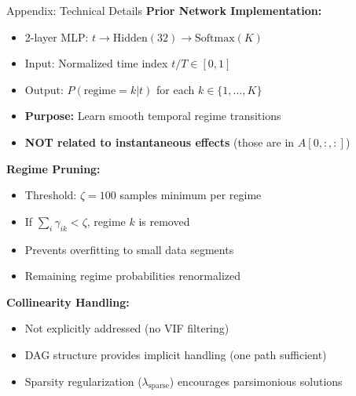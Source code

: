 \documentclass[aspectratio=169]{beamer}
\begin{document}
\begin{frame}{Appendix: Technical Details}
\textbf{Prior Network Implementation:}
\begin{itemize}
    \item 2-layer MLP: $t \to \text{Hidden}(32) \to \text{Softmax}(K)$
    \item Input: Normalized time index $t/T \in [0,1]$
    \item Output: $P(\text{regime}=k | t)$ for each $k \in \{1, \ldots, K\}$
    \item \textbf{Purpose:} Learn smooth temporal regime transitions
    \item \textbf{NOT related to instantaneous effects} (those are in $A[0,:,:]$)
\end{itemize}

\vspace{0.3cm}
\textbf{Regime Pruning:}
\begin{itemize}
    \item Threshold: $\zeta = 100$ samples minimum per regime
    \item If $\sum_i \gamma_{ik} < \zeta$, regime $k$ is removed
    \item Prevents overfitting to small data segments
    \item Remaining regime probabilities renormalized
\end{itemize}

\vspace{0.3cm}
\textbf{Collinearity Handling:}
\begin{itemize}
    \item Not explicitly addressed (no VIF filtering)
    \item DAG structure provides implicit handling (one path sufficient)
    \item Sparsity regularization ($\lambda_{\text{sparse}}$) encourages parsimonious solutions
\end{itemize}
\end{frame}
\end{document}

